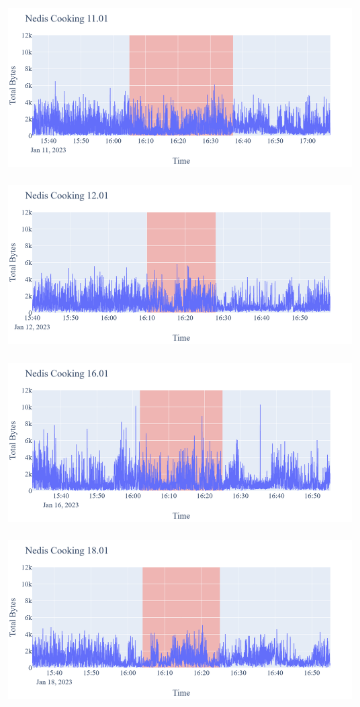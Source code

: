 \begin{figure}[H]
\begin{subfigure}[b]{0.5\textwidth}
        \centering
        \includegraphics[width=1.2\hsize]{figures/Nedis_Cooking_Bytes_11.01.png}
    \end{subfigure}
    \begin{subfigure}[b]{0.5\textwidth}
        \centering
        \includegraphics[width=1.2\hsize]{figures/Nedis_Cooking_Bytes_12.01.png}
    \end{subfigure}
    \begin{subfigure}[b]{0.5\textwidth}
        \centering
        \includegraphics[width=1.2\hsize]{figures/Nedis_Cooking_Bytes_16.01.png}
    \end{subfigure}
    \begin{subfigure}[b]{0.5\textwidth}
        \centering
        \includegraphics[width=1.2\hsize]{figures/Nedis_Cooking_Bytes_18.01.png}

\end{subfigure}
\end{figure}
